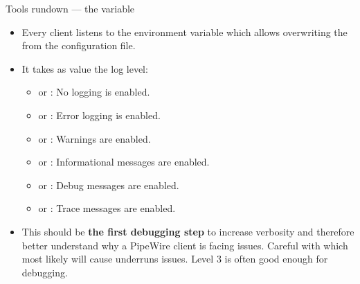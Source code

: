 \begin{frame}{Tools rundown — the  variable}
  \begin{itemize}

  \item Every client listens to the  environment
    variable which allows overwriting the  from the
    configuration file.

  \item It takes as value the log level:

    \begin{itemize}
    \item {} or : No logging is enabled.
    \item {} or : Error logging is enabled.
    \item {} or : Warnings are enabled.
    \item {} or : Informational messages are enabled.
    \item {} or : Debug messages are enabled.
    \item {} or : Trace messages are enabled.
    \end{itemize}

  \item This should be \textbf{the first debugging step} to increase
    verbosity and therefore better understand why a PipeWire client is
    facing issues. Careful with  which most
    likely will cause underruns issues. Level 3 is often good enough
    for debugging.

  \end{itemize}
\end{frame}



